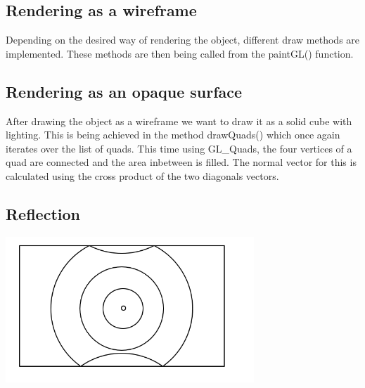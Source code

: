 \documentclass[12pt,a4paper]{scrartcl}
\begin{document}
\subsection{Rendering as a wireframe}
Depending on the desired way of rendering the object, different draw methods are implemented. These methods are then being called from the paintGL() function.

\subsection{Rendering as an opaque surface}
After drawing the object as a wireframe we want to draw it as a solid cube with lighting. This is being achieved in the method drawQuads() which once again iterates over the list of quads. This time using GL_Quads, the four vertices of a quad are connected and the area inbetween is filled. The normal vector for this is calculated using the cross product of the two diagonals vectors.

\subsection{Reflection}

\includegraphics[width=0.7\textwidth]{Images/Reflextion.png}
\end{document}
